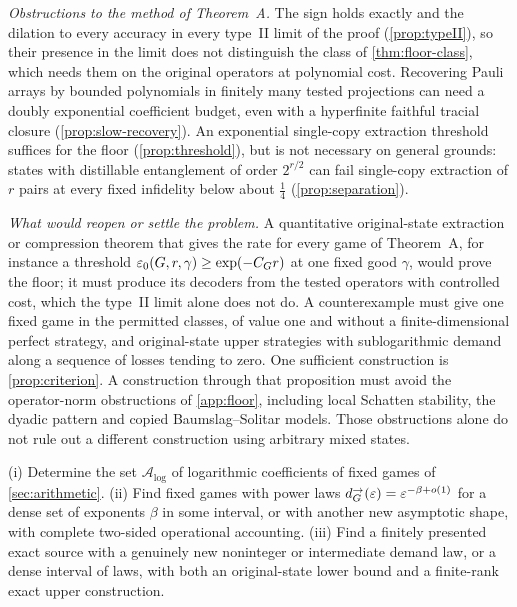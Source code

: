\emph{Obstructions to the method of Theorem~A.} The sign holds exactly and the dilation to every accuracy in every type~II limit of
the proof (\cref{prop:typeII}), so their presence in the limit does not distinguish the class of \cref{thm:floor-class}, which needs them on the
original operators at polynomial cost. Recovering Pauli arrays by bounded polynomials in finitely many tested projections can need a
doubly exponential coefficient budget, even with a hyperfinite faithful tracial closure (\cref{prop:slow-recovery}). An exponential
single-copy extraction threshold suffices for the floor (\cref{prop:threshold}), but is not necessary on general grounds: states with
distillable entanglement of order $2^{r/2}$ can fail single-copy extraction of $r$ pairs at every fixed infidelity below about
$\frac14$ (\cref{prop:separation}).

\emph{What would reopen or settle the problem.} A quantitative original-state extraction or compression theorem that gives the rate
for every game of Theorem~A, for instance a threshold $\varepsilon_0(G,r,\gamma)\ge\exp(-C_Gr)$ at one fixed good $\gamma$, would prove the
floor; it must produce its decoders from the tested operators with controlled cost, which the type~II limit alone does not do. A
counterexample must give one fixed game in the permitted classes, of value one and without a finite-dimensional perfect strategy, and
original-state upper strategies with sublogarithmic demand along a sequence of losses tending to zero. One sufficient construction is
\cref{prop:criterion}. A construction through that proposition must avoid the operator-norm obstructions of \cref{app:floor}, including
local Schatten stability, the dyadic pattern and copied Baumslag--Solitar models. Those obstructions alone do not rule out a different
construction using arbitrary mixed states.

\begin{problem}\label{prob:dense}
(i) Determine the set $\mathcal A_{\log}$ of logarithmic coefficients of fixed games of \cref{sec:arithmetic}. (ii) Find fixed games with
power laws $d^\to_G(\varepsilon)=\varepsilon^{-\beta+o(1)}$ for a dense set of exponents $\beta$ in some interval, or with another new asymptotic shape,
with complete two-sided operational accounting. (iii) Find a finitely presented exact source with a genuinely new noninteger or
intermediate demand law, or a dense interval of laws, with both an original-state lower bound and a finite-rank exact upper construction.
\end{problem}

